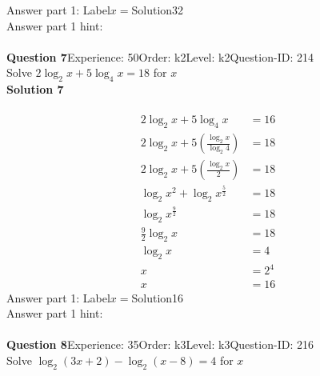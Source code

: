 \documentclass{article}
\begin{document}
Answer part 1: \hspace{10pt}Label\hspace{10pt}$x=$\hspace{10pt}Solution\hspace{10pt}32\\
Answer part 1 hint: \hspace{15pt}\\
\\[4pt]
\noindent\textbf{Question 7}\hspace{20pt}Experience: 50\hspace{20pt}Order: k2\hspace{20pt}Level: k2\hspace{20pt}Question-ID: 214\\[2pt]
Solve $2\log_{2}x+5\log_{4}x=18$ for $x$\\[4pt]
\noindent\textbf{Solution 7}\\[2pt]
\\[-35pt]\begin{align*}
2\log_{2}x+5\log_{4}x&=16\\[2pt]
2\log_{2}x+5\left(\displaystyle\frac{\log_{2}x}{\log_{2}4}\right)&=18\\[2pt]
2\log_{2}x+5\left(\displaystyle\frac{\log_{2}x}{2}\right)&=18\\[2pt]
\log_{2}x^2+\log_{2}x^{\frac{5}{2}}&=18\\[2pt]
\log_{2}x^{\frac{9}{2}}&=18\\[2pt]
\displaystyle\frac{9}{2}\log_{2}x&=18\\[2pt]
\log_{2}x&=4\\[2pt]
x&=2^{4}\\[2pt]
x&=16
\end{align*}
Answer part 1: \hspace{10pt}Label\hspace{10pt}$x=$\hspace{10pt}Solution\hspace{10pt}16\\
Answer part 1 hint: \hspace{15pt}\\
\\[4pt]
\noindent\textbf{Question 8}\hspace{20pt}Experience: 35\hspace{20pt}Order: k3\hspace{20pt}Level: k3\hspace{20pt}Question-ID: 216\\[2pt]
Solve $\log_{2}(3x+2)-\log_{2}(x-8)=4$ for $x$\\[4pt]
\end{document}
